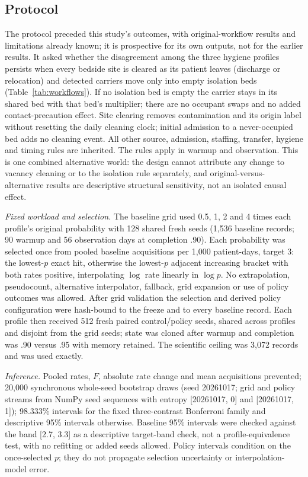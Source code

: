 \documentclass[11pt]{article}
\begin{document}
\subsection{Protocol}\label{sec:s-alt-protocol}
The protocol preceded this study's outcomes, with original-workflow
results and limitations already known; it is prospective for its own outputs,
not for the earlier results. It asked whether the disagreement among the three
hygiene profiles persists when every bedside site is cleared as its patient
leaves (discharge or relocation) and detected carriers move only into empty
isolation beds (Table~\ref{tab:workflows}). If no isolation bed is empty the
carrier stays in its shared bed with that bed's multiplier; there are no
occupant swaps and no added contact-precaution effect. Site clearing removes
contamination and its origin label without resetting the daily cleaning clock;
initial admission to a never-occupied bed adds no cleaning event. All other
source, admission, staffing, transfer, hygiene and timing rules are inherited.
The rules apply in warmup and observation. This is one combined alternative
world: the design cannot attribute any change to vacancy cleaning or to the
isolation rule separately, and original-versus-alternative results are
descriptive structural sensitivity, not an isolated causal effect.

\emph{Fixed workload and selection.} The baseline grid used 0.5, 1, 2 and 4 times
each profile's original probability with 128 shared fresh seeds (1,536 baseline
records; 90 warmup and 56 observation days at completion .90). Each probability
was selected once from pooled baseline acquisitions per 1,000 patient-days,
target 3: the lowest-$p$ exact hit, otherwise the lowest-$p$ adjacent increasing
bracket with both rates positive, interpolating $\log$ rate linearly in $\log p$.
No extrapolation, pseudocount, alternative interpolator, fallback, grid
expansion or use of policy outcomes was allowed. After grid validation the
selection and derived policy configuration were hash-bound to the freeze and to
every baseline record. Each profile then received 512 fresh paired control/policy
seeds, shared across profiles and disjoint from the grid seeds; state was cloned
after warmup and completion was .90 versus .95 with memory retained. The
scientific ceiling was 3,072 records and was used exactly.

\emph{Inference.} Pooled rates, $F$, absolute rate change and mean acquisitions
prevented; 20,000 synchronous whole-seed bootstrap draws (seed 20261017; grid and
policy streams from NumPy seed sequences with entropy [20261017, 0] and
[20261017, 1]); 98.333\% intervals for the fixed three-contrast
Bonferroni family and descriptive 95\% intervals otherwise. Baseline 95\%
intervals were checked against the band [2.7, 3.3] as a descriptive target-band
check, not a profile-equivalence test, with no refitting or added seeds allowed.
Policy intervals condition on the once-selected $p$; they do not propagate
selection uncertainty or interpolation-model error.
\end{document}
